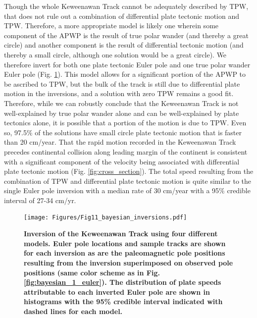 \documentclass[11pt,letterpaper]{article}
\begin{document}
Though the whole Keweenawan Track cannot be adequately described by TPW, that does not rule out a combination of differential plate tectonic motion and TPW. Therefore, a more appropriate model is likely one wherein some component of the APWP is the result of true polar wander (and thereby a great circle) and another component is the result of differential tectonic motion (and thereby a small circle, although one solution would be a great circle). We therefore invert for both one plate tectonic Euler pole and one true polar wander Euler pole (Fig. \ref{fig:bayesian_results}). This model allows for a significant portion of the APWP to be ascribed to TPW, but the bulk of the track is still due to differential plate motion in the inversions, and a solution with zero TPW remains a good fit.  Therefore, while we can robustly conclude that the Keweenawan Track is not well-explained by true polar wander alone and can be well-explained by plate tectonics alone, it is possible that a portion of the motion is due to TPW. Even so, 97.5$\%$ of the solutions have small circle plate tectonic motion that is faster than 20 cm/year. That the rapid motion recorded in the Keweenawan Track precedes continental collision along leading margin of the continent is consistent with a significant component of the velocity being associated with differential plate tectonic motion (Fig. \ref{fig:cross_section}). The total speed resulting from the combination of TPW and differential plate tectonic motion is quite similar to the single Euler pole inversion with a median rate of 30 cm/year with a 95$\%$ credible interval of 27-34 cm/yr.

\begin{figure}
\begin{centering}
\texttt{[image: Figures/Fig11\_bayesian\_inversions.pdf]}
\caption{\small{\textbf{Inversion of the Keweenawan Track using four different models. Euler pole locations and sample tracks are shown for each inversion as are the paleomagnetic pole positions resulting from the inversion superimposed on observed pole positions (same color scheme as in Fig. \ref{fig:bayesian_1_euler}). The distribution of plate speeds attributable to each inverted Euler pole are shown in histograms with the 95\% credible interval indicated with dashed lines for each model.}}}
\label{fig:bayesian_results}
\end{centering}
\end{figure}
\end{document}

